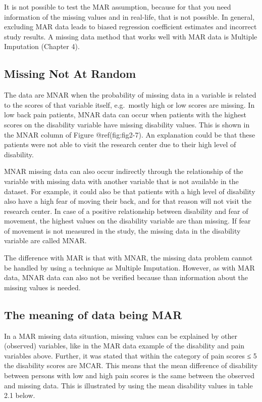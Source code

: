 \documentclass[
]{book}
\begin{document}
It is not possible to test the MAR assumption, because for that you need
information of the missing values and in real-life, that is not
possible. In general, excluding MAR data leads to biased regression
coefficient estimates and incorrect study results. A missing data method
that works well with MAR data is Multiple Imputation (Chapter 4).

\hypertarget{missing-not-at-random}{%
\subsection{Missing Not At Random}\label{missing-not-at-random}}

The data are MNAR when the probability of missing data in a variable is
related to the scores of that variable itself, e.g.~mostly high or low
scores are missing. In low back pain patients, MNAR data can occur when
patients with the highest scores on the disability variable have missing
disability values. This is shown in the MNAR column of Figure
@ref(fig:fig2-7). An explanation could be that these patients were not
able to visit the research center due to their high level of disability.

MNAR missing data can also occur indirectly through the relationship of
the variable with missing data with another variable that is not
available in the dataset. For example, it could also be that patients
with a high level of disability also have a high fear of moving their
back, and for that reason will not visit the research center. In case of
a positive relationship between disability and fear of movement, the
highest values on the disability variable are than missing. If fear of
movement is not measured in the study, the missing data in the
disability variable are called MNAR.

The difference with MAR is that with MNAR, the missing data problem
cannot be handled by using a technique as Multiple Imputation. However,
as with MAR data, MNAR data can also not be verified because than
information about the missing values is needed.

\hypertarget{the-meaning-of-data-being-mar}{%
\subsection{The meaning of data being
MAR}\label{the-meaning-of-data-being-mar}}

In a MAR missing data situation, missing values can be explained by
other (observed) variables, like in the MAR data example of the
disability and pain variables above. Further, it was stated that within
the category of pain scores ≤ 5 the disability scores are MCAR. This
means that the mean difference of disability between persons with low
and high pain scores is the same between the observed and missing data.
This is illustrated by using the mean disability values in table 2.1
below.
\end{document}
